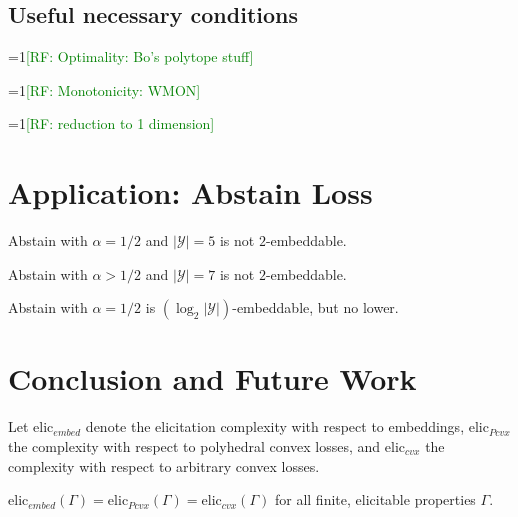 \documentclass[11pt]{colt2019}
\newcommand{\Comments}{1}
\newcommand{\mynote}[2]{\ifnum\Comments=1\textcolor{#1}{#2}\fi}
\newcommand{\raf}[1]{\mynote{green}{[RF: #1]}}
\newcommand{\Y}{\mathcal{Y}}
\begin{document}
\subsection{Useful necessary conditions}

\begin{corollary}
  \raf{Optimality: Bo's polytope stuff}
\end{corollary}

\begin{corollary}
  \raf{Monotonicity: WMON}
\end{corollary}

\begin{corollary}
  \raf{reduction to 1 dimension}
\end{corollary}

\section{Application: Abstain Loss}

\begin{theorem}
  Abstain with $\alpha=1/2$ and $|\Y|=5$ is not $2$-embeddable.
\end{theorem}

\begin{theorem}
  Abstain with $\alpha > 1/2$ and $|\Y|=7$ is not $2$-embeddable.
\end{theorem}

\begin{conjecture}
  Abstain with $\alpha=1/2$ is $(\log_2 |\Y|)$-embeddable, but no lower.
\end{conjecture}

\section{Conclusion and Future Work}

Let $\mathrm{elic}_{embed}$ denote the elicitation complexity with respect to embeddings, $\mathrm{elic}_{Pcvx}$ the complexity with respect to polyhedral convex losses, and $\mathrm{elic}_{cvx}$ the complexity with respect to arbitrary convex losses.

\begin{conjecture}
  $\mathrm{elic}_{embed}(\Gamma) = \mathrm{elic}_{Pcvx}(\Gamma) = \mathrm{elic}_{cvx}(\Gamma)$ for all finite, elicitable properties $\Gamma$.
\end{conjecture}


\end{document}
